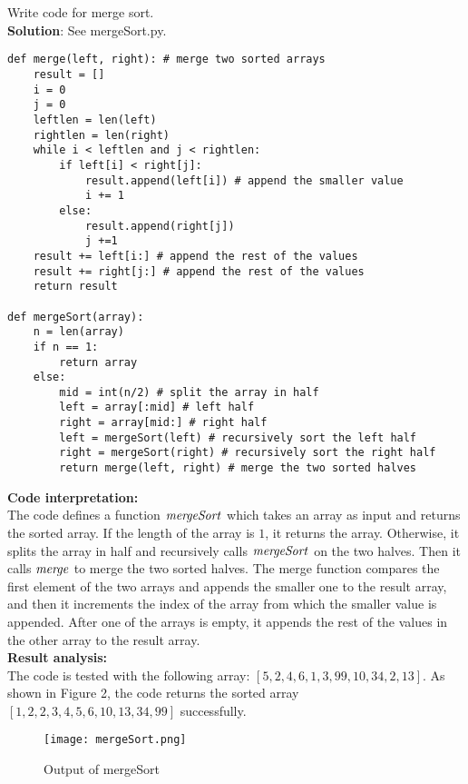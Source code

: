 \documentclass[UTF8]{ctexart}
\begin{document}
\section{}
Write code for merge sort.\\

\textbf{Solution}: See mergeSort.py.
\begin{lstlisting}
def merge(left, right): # merge two sorted arrays
    result = []
    i = 0
    j = 0
    leftlen = len(left)
    rightlen = len(right)
    while i < leftlen and j < rightlen:
        if left[i] < right[j]:
            result.append(left[i]) # append the smaller value
            i += 1
        else:
            result.append(right[j])
            j +=1
    result += left[i:] # append the rest of the values
    result += right[j:] # append the rest of the values
    return result

def mergeSort(array):
    n = len(array)
    if n == 1:
        return array
    else:
        mid = int(n/2) # split the array in half
        left = array[:mid] # left half
        right = array[mid:] # right half
        left = mergeSort(left) # recursively sort the left half
        right = mergeSort(right) # recursively sort the right half
        return merge(left, right) # merge the two sorted halves
\end{lstlisting}
\textbf{Code interpretation:} \\
The code defines a function $\it{mergeSort}$ which takes an array as input and returns the sorted array. 
If the length of the array is $1$, it returns the array. Otherwise, it splits the array in half and recursively calls $\it{mergeSort}$ on the two halves. 
Then it calls $\it{merge}$ to merge the two sorted halves. The merge function compares the first element of the two arrays and appends the smaller one to the result array, and then it increments the index of the array from which the smaller value is appended.
After one of the arrays is empty, it appends the rest of the values in the other array to the result array. \\
\textbf{Result analysis:} \\
The code is tested with the following array: $[5, 2, 4, 6, 1, 3, 99, 10, 34, 2, 13]$. As shown in Figure 2, the code returns the sorted array $[1, 2, 2, 3, 4, 5, 6, 10, 13, 34, 99]$ successfully.
\begin{figure}[H]
    \centering
    \texttt{[image: mergeSort.png]}
    \caption{Output of mergeSort}
\end{figure}
\end{document}
